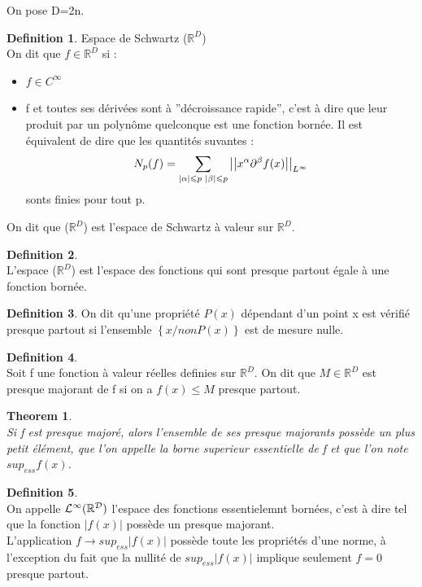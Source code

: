 \documentclass[a4paper,11pt]{article} %
\theoremstyle{plain}
\newtheorem{thm}{Theorem}[section]
\theoremstyle{definition}
\newtheorem{dfn}{Definition}[section]
\theoremstyle{remark}
\numberwithin{equation}{section}
\numberwithin{equation}{subsection}
\numberwithin{figure}{section}
\begin{document}
\noindent
On pose D=2n.
\begin{dfn} 
 Espace de Schwartz ($\mathbb{R}^{D}$)\\
On dit que $f \in \mathbb{R}^{D}$ si :
\begin{itemize}
 \item $f \in C^{\infty}$
 \item f et toutes ses dérivées sont à ''décroissance rapide'', c'est à dire que leur produit par un polynôme quelconque est une 
fonction bornée. Il est équivalent de dire que les quantités suvantes :
\begin{eqnarray*}
 N_{p} (f) = \sum_{ |\alpha| \leqslant p \hspace{1mm}   |\beta| \leqslant p }  
\left |  \left | x^{\alpha} \partial^{\beta} f(x)  \right |   \right |_{L^{\infty}}
\end{eqnarray*}
 sonts finies pour tout p.
\end{itemize}
On dit que ($\mathbb{R}^{D}$) est l'espace de Schwartz à valeur sur $\mathbb{R}^{D}$.
\end{dfn}
\begin{dfn} $\left. \right. $\\
 L'espace ($\mathbb{R}^{D}$) est l'espace des fonctions qui sont presque partout égale à une fonction bornée.
\end{dfn}
\begin{dfn} 
 On dit qu'une propriété $P(x)$ dépendant d'un point x est vérifié presque partout si l'ensemble $\left \{ x / non P(x) \right \}$ est 
de mesure nulle.
\end{dfn}
\begin{dfn} $\left. \right. $\\
  Soit f une fonction à valeur réelles definies sur $\mathbb{R}^{D}$. On dit que $M \in \mathbb{R}^{D}$ est presque majorant 
de f si on a $f(x)  \leqslant M$ presque partout.
\end{dfn}
\begin{thm}  $\left. \right. $\\
Si f est presque majoré, alors l'ensemble de ses presque majorants possède un plus petit élément, que l'on appelle la borne 
superieur essentielle de f et que l'on note $sup_{ess} f(x)$.
\end{thm}
\begin{dfn} $\left. \right. $\\
 On appelle $\cal{L}^{\infty}(\mathbb{R}^{D})$ l'espace des fonctions essentielemnt bornées, c'est à dire tel que la fonction $|f(x)|$ 
possède un presque majorant.\\
L'application $f \to sup_{ess} |f(x)| $ possède toute les propriétés d'une norme, à l'exception du fait que la nullité de $sup_{ess} |f(x)| $ 
implique seulement $f=0$ presque partout.
\end{dfn}
\end{document}
